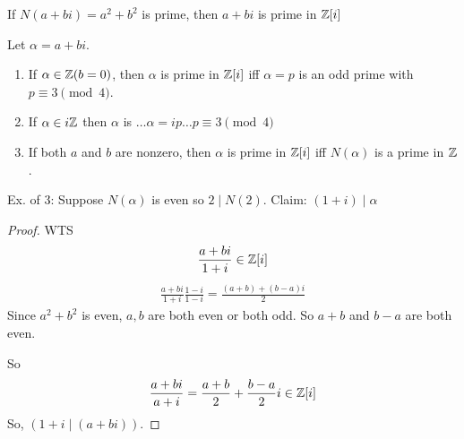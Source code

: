     \begin{corollary}
        If $N(a+bi) = a^2+b^2$ is prime, then $a+bi$ is prime in $\mathbb{Z}[i]$
    \end{corollary}

    \begin{theorem} 
        Let $\alpha = a+bi$.
        \begin{enumerate}
            \item If $\alpha\in\mathbb{Z} (b=0)$, then $\alpha$ is prime in $\mathbb{Z}[i]$ 
            iff $\alpha = p$ is an odd prime with $p\equiv 3\pmod{4}$. 
            \item If $\alpha\in i\mathbb{Z}$ then $\alpha$ is $\dots \alpha = ip \dots p\equiv 3\pmod{4}$
            \item If both $a$ and $b$ are nonzero, then $\alpha$ is prime in $\mathbb{Z}[i]$ iff $N(\alpha)$ is a prime in $\mathbb{Z}$. 
        \end{enumerate}
        Ex. of 3: Suppose $N(\alpha)$ is even so $2\mid N(2)$. 
        Claim: $(1+i)\mid\alpha$
        \begin{proof}
            WTS 
            \[
                \frac{a+bi}{1+i} \in\mathbb{Z}[i]
            \]
            \begin{align*}
                \frac{a+bi}{1+i}\frac{1-i}{1-i} = \frac{(a+b)+(b-a)i}{2}
            \end{align*}
            Since $a^2+b^2$ is even, $a,b$ are both even or both odd.
            So $a+b$ and $b-a$ are both even.

            So \[ \frac{a+bi}{a+i} = \frac{a+b}{2} + \frac{b-a}{2}i \in\mathbb{Z}[i] \]
            So, $(1+i\mid (a+bi))$.
        \end{proof}
    \end{theorem}